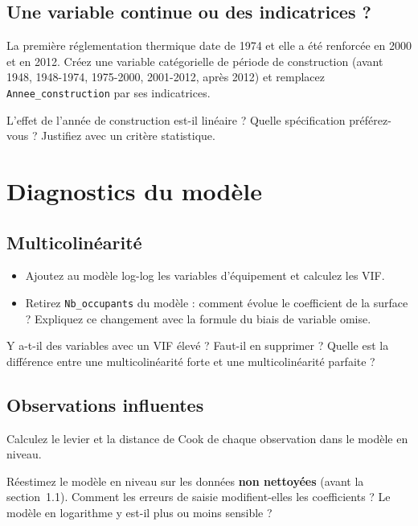 \documentclass[11pt,a4paper]{article}
\newcommand{\var}[1]{\texttt{#1}}
\begin{document}
\subsection{Une variable continue ou des indicatrices ?}
La première réglementation thermique date de 1974 et elle a été renforcée en 2000 et en 2012. Créez une variable catégorielle de période de construction (avant 1948, 1948-1974, 1975-2000, 2001-2012, après 2012) et remplacez \var{Annee\_construction} par ses indicatrices.

\begin{question}
L'effet de l'année de construction est-il linéaire ? Quelle spécification préférez-vous ? Justifiez avec un critère statistique.
\end{question}

\section{Diagnostics du modèle}

\subsection{Multicolinéarité}
\begin{itemize}
  \item Ajoutez au modèle log-log les variables d'équipement et calculez les VIF.
  \item Retirez \var{Nb\_occupants} du modèle : comment évolue le coefficient de la surface ? Expliquez ce changement avec la formule du biais de variable omise.
\end{itemize}

\begin{question}
Y a-t-il des variables avec un VIF élevé ? Faut-il en supprimer ? Quelle est la différence entre une multicolinéarité forte et une multicolinéarité parfaite ?
\end{question}

\subsection{Observations influentes}
Calculez le levier et la distance de Cook de chaque observation dans le modèle en niveau.

\begin{afaire}
Réestimez le modèle en niveau sur les données \textbf{non nettoyées} (avant la section~1.1). Comment les erreurs de saisie modifient-elles les coefficients ? Le modèle en logarithme y est-il plus ou moins sensible ?
\end{afaire}
\end{document}
